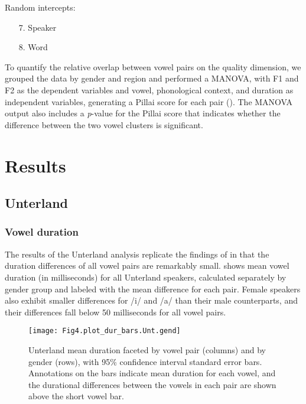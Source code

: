 \documentclass[output=paper,colorlinks,citecolor=brown]{langscibook}
\begin{document}
Random intercepts:

\begin{enumerate}
\item[7.] Speaker
\item[8.] Word
\end{enumerate}

To quantify the relative overlap between vowel pairs on the quality dimension, we grouped the data by gender and region and performed a MANOVA, with F1 and F2 as the dependent variables and vowel, phonological context, and duration as independent variables, generating a Pillai score for each pair (\citealt{HayDrager2006, NyczHall-Lew2013}). The MANOVA output also includes a \textit{p}-value for the Pillai score that indicates whether the difference between the two vowel clusters is significant.

\section{Results}
\label{sec:nove:5}
\subsection{Unterland}
\label{sec:nove:5.1}
\subsubsection{Vowel duration}
\label{sec:nove:5.1.1}

The results of the Unterland analysis replicate the findings of \citet{Nove2021} in that the duration differences of all vowel pairs are remarkably small.  shows mean vowel duration (in milliseconds) for all Unterland speakers, calculated separately by gender group and labeled with the mean difference for each pair. Female speakers also exhibit smaller differences for \mbox{/i/} and \mbox{/a/} than their male counterparts, and their differences fall below 50 milliseconds for all vowel pairs.

  \largerpage
\begin{figure}
\texttt{[image: Fig4.plot\_dur\_bars.Unt.gend]}
\caption{\label{fig:nove:4}Unterland mean duration faceted by vowel pair (columns) and by gender (rows), with 95\% confidence interval standard error bars. Annotations on the bars indicate mean duration for each vowel, and the durational differences between the vowels in each pair are shown above the short vowel bar.}
\end{figure}
\end{document}
